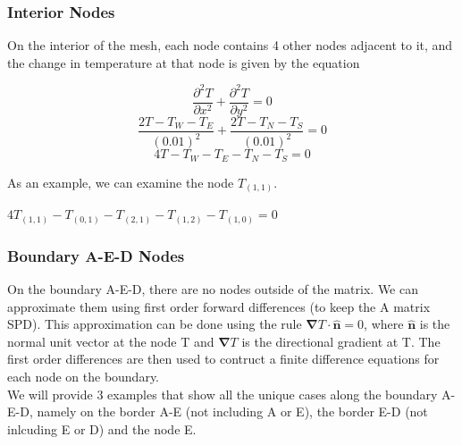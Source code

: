 \documentclass[12pt,a4paper]{article}
\begin{document}
\subsubsection{Interior Nodes}
On the interior of the mesh, each node contains 4 other nodes adjacent to it, and the change in temperature at that node is given by the equation
\begin{center}
\[\frac{\partial^2 T}{\partial x^2}+\frac{\partial^2 T}{\partial y^2}=0\]
\[\frac{2T-T_W-T_E}{(0.01)^2}+\frac{2T-T_N-T_S}{(0.01)^2}=0\]
\[4T-T_W-T_E-T_N-T_S=0\]
\end{center}
\begin{center}
\end{center}
As an example, we can examine the node $T_{(1,1)}$.
\begin{center}
  $4T_{(1,1)}-T_{(0,1)}-T_{(2,1)}-T_{(1,2)}-T_{(1,0)}=0$
\end{center}
\subsubsection*{Boundary A-E-D Nodes}
On the boundary A-E-D, there are no nodes outside of the matrix. We can approximate them using first order forward differences (to keep the A matrix SPD). This approximation can be done using the rule $\boldsymbol{\nabla} T \cdot {\hat{\textbf{n}}} = 0$, where ${\hat{\textbf{n}}}$ is the normal unit vector at the node T and $\boldsymbol{\nabla} T$ is the directional gradient at T. The first order differences are then used to contruct a finite difference equations for each node on the boundary.\\We will provide 3 examples that show all the unique cases along the boundary A-E-D, namely on the border A-E (not including A or E), the border E-D (not inlcuding E or D) and the node E.
\end{document}
